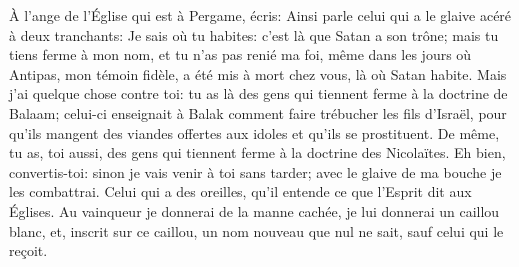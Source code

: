 À l’ange de l’Église qui est à Pergame, écris:
	Ainsi parle celui qui a le glaive acéré à deux tranchants:
	Je sais où tu habites: c’est là que Satan a son trône;
	mais tu tiens ferme à mon nom, et tu n’as pas renié ma foi,
	même dans les jours où Antipas, mon témoin fidèle,
	a été mis à mort chez vous, là où Satan habite.
Mais j’ai quelque chose contre toi:
	tu as là des gens qui tiennent ferme à la doctrine de Balaam;
	celui-ci enseignait à Balak comment faire trébucher les fils d’Israël,
	pour qu’ils mangent des viandes offertes aux idoles
		et qu’ils se prostituent.
De même, tu as, toi aussi,
	des gens qui tiennent ferme à la doctrine des Nicolaïtes.
Eh bien, convertis-toi: sinon je vais venir à toi sans tarder;
	avec le glaive de ma bouche je les combattrai.
Celui qui a des oreilles, qu’il entende ce que l’Esprit dit aux Églises.
Au vainqueur je donnerai de la manne cachée,
	je lui donnerai un caillou blanc, et, inscrit sur ce caillou,
	un nom nouveau que nul ne sait, sauf celui qui le reçoit.

